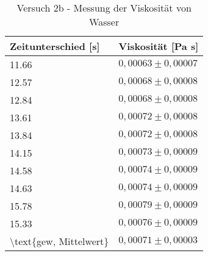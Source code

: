 \begin{table}[!h]
\centering
\begin{tabular}{|l|l|}
 \hline
Zeitunterschied [s] & Viskosität [Pa s]\\
\hline
\num{11,66} & $0,00063 \pm 0,00007$\\
\hline
\num{12,57} & $0,00068 \pm 0,00008$\\
\hline
\num{12,84} & $0,00068 \pm 0,00008$\\
\hline
\num{13,61} & $0,00072 \pm 0,00008$\\
\hline
\num{13,84} & $0,00072 \pm 0,00008$\\
\hline
\num{14,15} & $0,00073 \pm 0,00009$\\
\hline
\num{14,58} & $0,00074 \pm 0,00009$\\
\hline
\num{14,63} & $0,00074 \pm 0,00009$\\
\hline
\num{15,78} & $0,00079 \pm 0,00009$\\
\hline
\num{15,33} & $0,00076 \pm 0,00009$\\
\hline
\num{\text{gew, Mittelwert}} & $0,00071 \pm 0,00003$\\

 \hline
\end{tabular}
\caption{Versuch 2b - Messung der Viskosität von Wasser}\label{tbl:visko2b}\end{table}